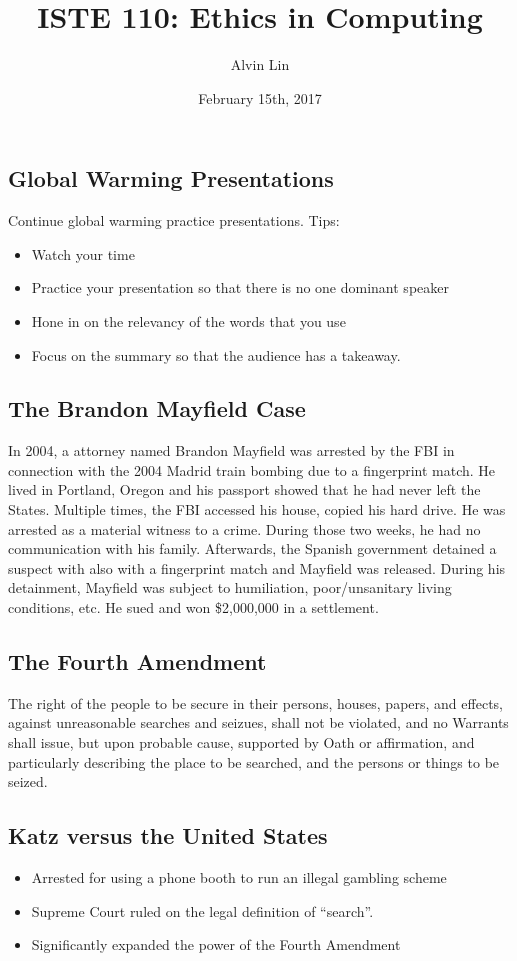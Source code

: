 \documentclass[letterpaper, 12pt]{article}
\title{ISTE 110: Ethics in Computing}
\author{Alvin Lin}
\date{February 15th, 2017}
\begin{document}
\maketitle

\subsection*{Global Warming Presentations}
Continue global warming practice presentations. Tips:
\begin{itemize}
  \item Watch your time
  \item Practice your presentation so that there is no one dominant speaker
  \item Hone in on the relevancy of the words that you use
  \item Focus on the summary so that the audience has a takeaway.
\end{itemize}

\subsection*{The Brandon Mayfield Case}
In 2004, a attorney named Brandon Mayfield was arrested by the FBI in connection
with the 2004 Madrid train bombing due to a fingerprint match. He lived in
Portland, Oregon and his passport showed that he had never left the States.
Multiple times, the FBI accessed his house, copied his hard drive. He was
arrested as a material witness to a crime. During those two weeks, he had no
communication with his family. Afterwards, the Spanish government detained a
suspect with also with a fingerprint match and Mayfield was released. During
his detainment, Mayfield was subject to humiliation, poor/unsanitary living
conditions, etc. He sued and won \$2,000,000 in a settlement.

\subsection*{The Fourth Amendment}
The right of the people to be secure in their persons, houses, papers, and
effects, against unreasonable searches and seizues, shall not be violated, and
no Warrants shall issue, but upon probable cause, supported by Oath or
affirmation, and particularly describing the place to be searched, and the
persons or things to be seized.

\subsection*{Katz versus the United States}
\begin{itemize}
  \item Arrested for using a phone booth to run an illegal gambling scheme
  \item Supreme Court ruled on the legal definition of ``search''.
  \item Significantly expanded the power of the Fourth Amendment
\end{itemize}
\end{document}
